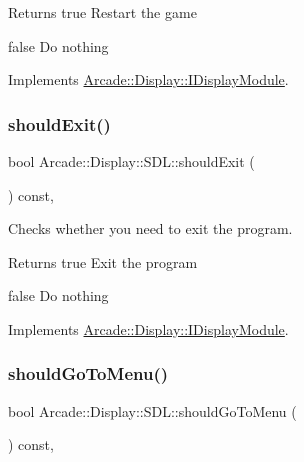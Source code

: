 \begin{DoxyReturn}{Returns}
true Restart the game 

false Do nothing 
\end{DoxyReturn}


Implements \mbox{\hyperlink{classArcade_1_1Display_1_1IDisplayModule_adc5d499229aa5899bbd4bae14f00cb27}{Arcade\+::\+Display\+::\+I\+Display\+Module}}.

\mbox{\label{classArcade_1_1Display_1_1SDL_adb5d8837174b0ca120a27a521320f9c0}} 
\subsubsection{\texorpdfstring{shouldExit()}{shouldExit()}}
{\footnotesize\ttfamily bool Arcade\+::\+Display\+::\+S\+D\+L\+::should\+Exit (\begin{DoxyParamCaption}{ }\end{DoxyParamCaption}) const\hspace{0.3cm}{\ttfamily [final]}, {\ttfamily [virtual]}}



Checks whether you need to exit the program. 

\begin{DoxyReturn}{Returns}
true Exit the program 

false Do nothing 
\end{DoxyReturn}


Implements \mbox{\hyperlink{classArcade_1_1Display_1_1IDisplayModule_a550877fb92d58325404b9ebe9e71f6ff}{Arcade\+::\+Display\+::\+I\+Display\+Module}}.

\mbox{\label{classArcade_1_1Display_1_1SDL_a044e009d7fc03813fce09abed3a6694c}} 
\subsubsection{\texorpdfstring{shouldGoToMenu()}{shouldGoToMenu()}}
{\footnotesize\ttfamily bool Arcade\+::\+Display\+::\+S\+D\+L\+::should\+Go\+To\+Menu (\begin{DoxyParamCaption}{ }\end{DoxyParamCaption}) const\hspace{0.3cm}{\ttfamily [final]}, {\ttfamily [virtual]}}




